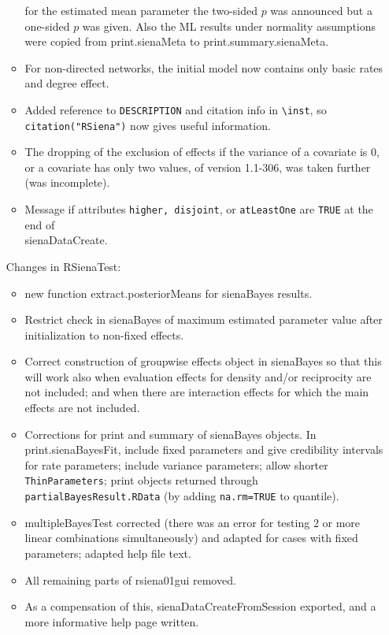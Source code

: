 \documentclass[a4paper,fleqn,11pt]{article}
\newcommand{\+}{\, + \,}
\newcommand{\sfn}[1]{\textsf{#1}}
\begin{document}
\begin{small}
\begin{itemize}
\begin{itemize}
     for the estimated mean parameter the two-sided $p$ was announced but a
     one-sided $p$ was given. Also the ML results under normality assumptions
     were copied from \sfn{print.sienaMeta} to \sfn{print.summary.sienaMeta}.
   \item For non-directed networks, the initial model now contains
    only basic rates and degree effect.
   \item Added reference to \texttt{DESCRIPTION} and citation info in
    \texttt{{\textbackslash}inst},
   so \texttt{citation("RSiena")} now gives useful information.
   \item The dropping of the exclusion of effects if the variance of a
     covariate is 0, or a covariate has only two values, of version 1.1-306,
     was  taken further (was incomplete).
   \item Message if attributes \texttt{higher, disjoint},
   or \texttt{atLeastOne} are \texttt{TRUE} at the end of \\
     \sfn{sienaDataCreate}.
   \end{itemize}
Changes in RSienaTest:
\begin{itemize}
   \item new function \sfn{extract.posteriorMeans} for \sfn{sienaBayes} results.
   \item Restrict check in \sfn{sienaBayes} of maximum
     estimated parameter value after initialization to non-fixed effects.
   \item Correct construction of groupwise effects object in \sfn{sienaBayes}
    so that this
     will work also when evaluation effects for density and/or reciprocity are
     not included; and when there are interaction effects for which the main
     effects are not included.
   \item Corrections for \sfn{print} and \sfn{summary} of \sfn{sienaBayes} objects.
     In \sfn{print.sienaBayesFit}, include fixed parameters and
     give credibility intervals for rate parameters; include variance parameters;
     allow shorter \texttt{ThinParameters};
     print objects returned through \\
     \texttt{partialBayesResult.RData}
     (by adding \texttt{na.rm=TRUE} to quantile).
   \item \sfn{multipleBayesTest} corrected (there was an error for testing
      2 or more linear combinations simultaneously)
       and adapted for cases with fixed  parameters;
     adapted help file text.
   \item All remaining parts of \sfn{rsiena01gui} removed.
   \item As a compensation of this, \sfn{sienaDataCreateFromSession} exported,
   and a more informative help page written.
\end{itemize}


\end{itemize}
\end{small}
\end{document}
